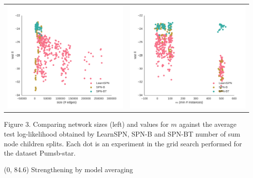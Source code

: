 \documentclass[final]{beamer}
\begin{document}
\begin{frame}{}
\begin{textblock}{25.7}
    \begin{table}[ht]
      \setlength{\tabcolsep}{30pt}  
      \centering
      \begin{tabular}{c c}
        \includegraphics[width=0.4\linewidth]{figures/ll-depth/pumsb-star-ll-depth}&\includegraphics[width=0.4\linewidth]{figures/ll-m/pumsb-star-ll-m}
      \end{tabular}
    \end{table}
    \vspace{-20pt}
    \begin{center}
      \begin{minipage}[t]{0.9\linewidth}
        \tiny\flushleft
        Figure 3. Comparing network sizes (left) and values for $m$
        against the  average test
        log-likelihood obtained by \textsf{LearnSPN}, \textsf{SPN-B} and
        \textsf{SPN-BT}
        number of sum node children splits. Each dot is an experiment
        in the grid search performed for the dataset Pumsb-star.
      \end{minipage}
    \end{center}

  \end{textblock}
  
  
  
  
  \begin{textblock}{80}(0, 84.6)
    Strengthening by model averaging
  \end{textblock}
  

\end{frame}
\end{document}
